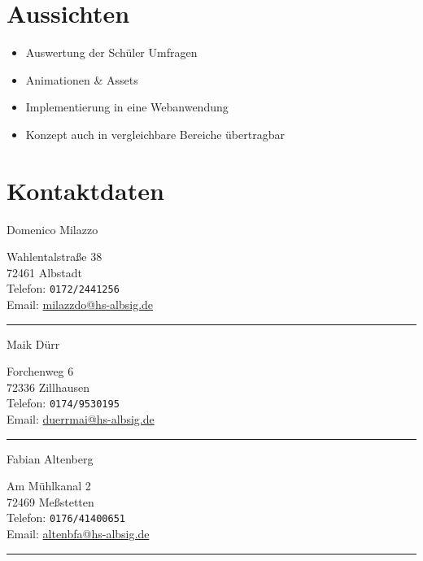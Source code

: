 \documentclass[a0,portrait]{a0poster}
\begin{document}
\begin{multicols}{2}


\section*{\huge Aussichten}

\begin{doublespace}
\begin{itemize}
\item {\LARGE Auswertung der Schüler Umfragen}
\item {\LARGE Animationen \& Assets}
\item {\LARGE Implementierung in eine Webanwendung}
\item {\LARGE Konzept auch in vergleichbare Bereiche übertragbar}
\end{itemize}
\end{doublespace}

\color{Black}
\section*{\huge Kontaktdaten}


{\huge Domenico Milazzo}\\[1cm] %
{\LARGE 
Wahlentalstraße 38\\
72461 Albstadt\\
Telefon: \texttt{0172/2441256}\\ %
Email: \href{mailto:milazzdo@hs-albsig.de}{milazzdo@hs-albsig.de} %

}
\hrule
\vspace{2cm} %

{\huge\flushleft Maik Dürr}\\[1cm] %
{\LARGE 
Forchenweg 6\\
72336 Zillhausen\\
Telefon: \texttt{0174/9530195}\\ %
Email: \href{mailto:duerrmai@hs-albsig.de}{duerrmai@hs-albsig.de} %

}
\hrule
\vspace{2cm}

{\huge\flushleft Fabian Altenberg}\\[1cm] %
{\LARGE 
Am Mühlkanal 2\\
72469 Meßstetten\\
Telefon: \texttt{0176/41400651}\\ %
Email: \href{mailto:altenbfa@hs-albsig.de}{altenbfa@hs-albsig.de} %

}
\hrule

\end{multicols}
\end{document}
